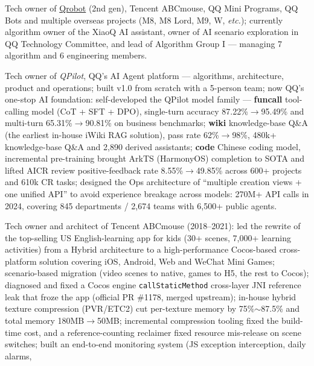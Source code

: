 {
  \begin{tightitemize}%
  \item Tech owner of \href{https://qrobot.qq.com/}{Qrobot} (2nd gen), Tencent ABCmouse,
    QQ Mini Programs, QQ Bots and multiple overseas projects (M8, M8 Lord, M9, W, \textsl{etc.});
    currently algorithm owner of the XiaoQ AI assistant, owner of AI scenario exploration in
    QQ Technology Committee, and lead of Algorithm Group I --- managing 7 algorithm and 6 engineering members.
  \item Tech owner of \textsl{QPilot}, QQ's AI Agent platform --- algorithms, architecture,
    product and operations; built v1.0 from scratch with a 5-person team; now QQ's one-stop AI foundation:
    self-developed the QPilot model family --- \textbf{funcall} tool-calling model (CoT + SFT + DPO),
    single-turn accuracy 87.22\%$\rightarrow$95.49\% and multi-turn 65.31\%$\rightarrow$90.81\% on business benchmarks;
    \textbf{wiki} knowledge-base Q\&A (the earliest in-house iWiki RAG solution), pass rate 62\%$\rightarrow$98\%,
    480k+ knowledge-base Q\&A and 2,890 derived assistants; \textbf{code} Chinese coding model,
    incremental pre-training brought ArkTS (HarmonyOS) completion to SOTA and lifted AICR review
    positive-feedback rate 8.55\%$\rightarrow$49.85\% across 600+ projects and 610k CR tasks;
    designed the Ops architecture of ``multiple creation views + one unified API'' to avoid
    experience breakage across models: 270M+ API calls in 2024, covering 845 departments /
    2,674 teams with 6,500+ public agents.
  \item Tech owner and architect of Tencent ABCmouse (2018--2021): led the rewrite of the
    top-selling US English-learning app for kids (30+ scenes, 7,000+ learning activities)
    from a Hybrid architecture to a high-performance Cocos-based cross-platform solution
    covering iOS, Android, Web and WeChat Mini Games;
    scenario-based migration (video scenes to native, games to H5, the rest to Cocos);
    diagnosed and fixed a Cocos engine \texttt{callStaticMethod} cross-layer JNI reference
    leak that froze the app (official PR \#1178, merged upstream);
    in-house hybrid texture compression (PVR/ETC2) cut per-texture memory by 75\%$\sim$87.5\%
    and total memory 180MB$\rightarrow$50MB;
    incremental compression tooling fixed the build-time cost, and a reference-counting
    reclaimer fixed resource mis-release on scene switches;
    built an end-to-end monitoring system (JS exception interception, daily alarms,

\end{tightitemize}}
